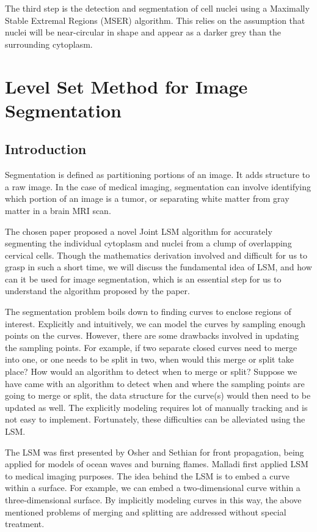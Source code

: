 \documentclass[12pt, letter]{article}
\begin{document}
The third step is the detection and segmentation of cell nuclei using a Maximally Stable Extremal Regions (MSER) algorithm. This relies on the assumption that nuclei will be near-circular in shape and appear as a darker grey than the surrounding cytoplasm.

\section{Level Set Method for Image Segmentation}
\subsection{Introduction}
Segmentation is defined as partitioning portions of an image. It adds structure to a raw image. In the case of medical imaging, segmentation can involve identifying which portion of an image is a tumor, or separating white matter from gray matter in a brain MRI scan. 

The chosen paper proposed a novel Joint LSM algorithm for accurately segmenting the individual cytoplasm and nuclei from a clump of overlapping cervical cells. Though the mathematics derivation involved and difficult for us to grasp in such a short time, we will discuss the fundamental idea of LSM, and how can it be used for image segmentation, which is an essential step for us to understand the algorithm proposed by the paper. 

The segmentation problem boils down to finding curves to enclose regions of interest. Explicitly and intuitively, we can model the curves by sampling enough points on the curves. However, there are some drawbacks involved in updating the sampling points. For example, if two separate closed curves need to merge into one, or one needs to be split in two, when would this merge or split take place? How would an algorithm to detect when to merge or split? Suppose we have came with an algorithm to detect when and where the sampling points are going to merge or split, the data structure for the curve(s) would then need to be updated as well. The explicitly modeling requires lot of manually tracking and is not easy to implement. Fortunately, these difficulties can be alleviated using the LSM. 

The LSM was first presented by Osher and Sethian for front propagation, being applied for models of ocean waves and burning flames. Malladi first applied LSM to medical imaging purposes. The idea behind the LSM is to embed a curve within a surface. For example, we can embed a two-dimensional curve within a three-dimensional surface. By implicitly modeling curves in this way, the above mentioned problems of merging and splitting are addressed without special treatment. 
\end{document}
